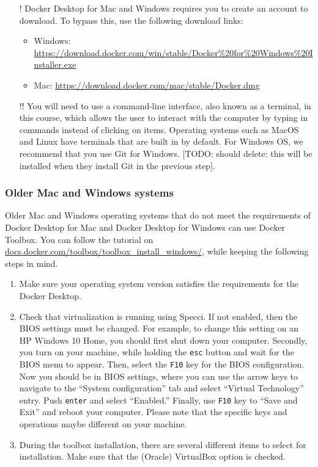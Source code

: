 \begin{itemize}
	\item[!] Docker Desktop for Mac and Windows requires you to create an account to download. To bypass this, use the following download links:
	\begin{itemize}
		\item Windows: \url{ https://download.docker.com/win/stable/Docker%20for%20Windows%20Installer.exe}
		\item Mac: \url{ https://download.docker.com/mac/stable/Docker.dmg}
	\end{itemize}
	\item[!!] You will need to use a command-line interface, also known as a terminal, in this course, which allows the user to interact with the computer by typing in commands instead of clicking on items. Operating systems such as MacOS and Linux have terminals that are built in by default. For Windows OS, we recommend that you use Git for Windows. [TODO: should delete: this will be installed when they install Git in the previous step].
\end{itemize}
	

\subsubsection*{Older Mac and Windows systems}
Older Mac and Windows operating systems that do not meet the requirements of Docker Desktop for Mac and Docker Desktop for Windows can use Docker Toolbox. You can follow the tutorial on \url{docs.docker.com/toolbox/toolbox_install_windows/}, while keeping the following steps in mind.

\begin{enumerate}
	\item Make sure your operating system version satisfies the requirements for the Docker Desktop.
	\item Check that virtualization is running using Specci. If not enabled, then the BIOS settings must be changed. For example, to change this setting on an HP Windows 10 Home, you should first shut down your computer. Secondly, you turn on your machine, while holding the {\tt esc} button and wait for the BIOS menu to appear. Then, select the {\tt F10} key for the BIOS configuration. Now you should be in BIOS settings, where you can use the arrow keys to navigate to the ``System configuration'' tab and select ``Virtual Technology'' entry. Push {\tt enter} and select ``Enabled.'' Finally, use {\tt F10} key to ``Save and Exit'' and reboot your computer. Please note that the specific keys and operations maybe different on your machine.
	\item During  the toolbox installation, there are several different items to select for installation. Make sure  that the (Oracle) VirtualBox option is checked.
\end{enumerate}

